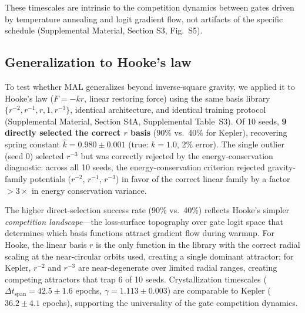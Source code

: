 \documentclass[aps,pre,reprint,superscriptaddress,longbibliography]{revtex4-2}
\begin{document}
These timescales are intrinsic to the competition dynamics between gates driven by temperature annealing and logit gradient flow, not artifacts of the specific schedule (Supplemental Material, Section S3, Fig.~S5).

\subsection{Generalization to Hooke's law}
To test whether MAL generalizes beyond inverse-square gravity, we applied it to Hooke's law ($F = -kr$, linear restoring force) using the same basis library $\{r^{-2}, r^{-1}, r, 1, r^{-3}\}$, identical architecture, and identical training protocol (Supplemental Material, Section S4A, Supplemental Table~S3). Of 10 seeds, \textbf{9 directly selected the correct $r$ basis} (90\% vs.\ 40\% for Kepler), recovering spring constant $\hat{k} = 0.980 \pm 0.001$ (true: $k = 1.0$, 2\% error). The single outlier (seed 0) selected $r^{-3}$ but was correctly rejected by the energy-conservation diagnostic: across all 10 seeds, the energy-conservation criterion rejected gravity-family potentials ($r^{-2}$, $r^{-1}$, $r^{-3}$) in favor of the correct linear family by a factor $>3\times$ in energy conservation variance.

The higher direct-selection success rate (90\% vs.\ 40\%) reflects Hooke's simpler \textit{competition landscape}---the loss-surface topography over gate logit space that determines which basis functions attract gradient flow during warmup. For Hooke, the linear basis $r$ is the only function in the library with the correct radial scaling at the near-circular orbits used, creating a single dominant attractor; for Kepler, $r^{-2}$ and $r^{-3}$ are near-degenerate over limited radial ranges, creating competing attractors that trap 6 of 10 seeds. Crystallization timescales ($\Delta t_{\text{span}} = 42.5 \pm 1.6$ epochs, $\gamma = 1.113 \pm 0.003$) are comparable to Kepler ($36.2 \pm 4.1$ epochs), supporting the universality of the gate competition dynamics.
\end{document}
